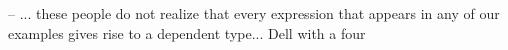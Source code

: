 -- ... these people do not realize that every expression 
that appears in any of our examples gives rise to
a dependent type... Dell with a four

















